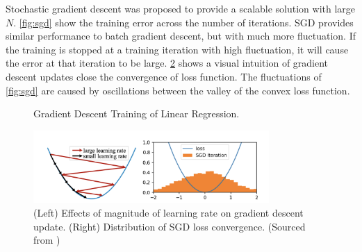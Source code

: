 \documentclass{article}
\begin{document}
Stochastic gradient descent was proposed to provide a scalable solution with large $N$. \cref{fig:sgd} show the training error across the number of iterations. SGD provides similar performance to batch gradient descent, but with much more fluctuation. If the training is stopped at a training iteration with high fluctuation, it will cause the error at that iteration to be large. \cref{fig:sgd_noise} shows a visual intuition of gradient descent updates close the convergence of loss function. The fluctuations of \cref{fig:sgd} are caused by oscillations between the valley of the convex loss function.

\begin{figure}[h!]
    \caption{Gradient Descent Training of Linear Regression.}
    \label{fig:gd_training}
\end{figure}

\begin{figure}[h!]
    \centering
    \includegraphics[width=0.8\textwidth]{Figures/sgd_update.png} 
    \caption{(Left) Effects of magnitude of learning rate on gradient descent update. (Right) Distribution of SGD loss convergence. (Sourced from \cite{liu2021noise})}
    \label{fig:sgd_noise}
\end{figure}
\end{document}
